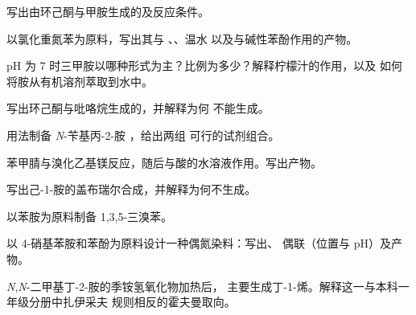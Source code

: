 \begin{exercise}[$\star$]\label{exo:b2:amines:3}
写出由环己酮与甲胺生成的及反应条件。
\end{exercise}

\begin{exercise}[$\star$]\label{exo:b2:amines:4}
以氯化重氮苯为原料，写出其与 、、温水
以及与碱性苯酚作用的产物。
\end{exercise}

\begin{exercise}[$\star\star$]\label{exo:b2:amines:5}
pH 为 7 时三甲胺以哪种形式为主？比例为多少？解释柠檬汁的作用，以及
如何将胺从有机溶剂萃取到水中。
\end{exercise}

\begin{exercise}[$\star\star$]\label{exo:b2:amines:6}
写出环己酮与吡咯烷生成的，并解释为何
不能生成。
\end{exercise}

\begin{exercise}[$\star\star$]\label{exo:b2:amines:7}
用法制备 \textit{N}-苄基丙-2-胺 ，给出两组
可行的试剂组合。
\end{exercise}

\begin{exercise}[$\star\star$]\label{exo:b2:amines:8}
苯甲腈与溴化乙基镁反应，随后与酸的水溶液作用。写出产物。
\end{exercise}

\begin{exercise}[$\star\star$]\label{exo:b2:amines:9}
写出己-1-胺的盖布瑞尔合成，并解释为何不生成。
\end{exercise}

\begin{exercise}[$\star\star\star$]\label{exo:b2:amines:10}
以苯胺为原料制备 1,3,5-三溴苯。
\end{exercise}

\begin{exercise}[$\star\star\star$]\label{exo:b2:amines:11}
以 4-硝基苯胺和苯酚为原料设计一种偶氮染料：写出、
偶联（位置与 pH）及产物。
\end{exercise}

\begin{exercise}[$\star\star\star$]\label{exo:b2:amines:12}
\textit{N},\textit{N}-二甲基丁-2-胺的季铵氢氧化物加热后，
主要生成丁-1-烯。解释这一与本科一年级分册中扎伊采夫
规则相反的霍夫曼取向。
\end{exercise}

